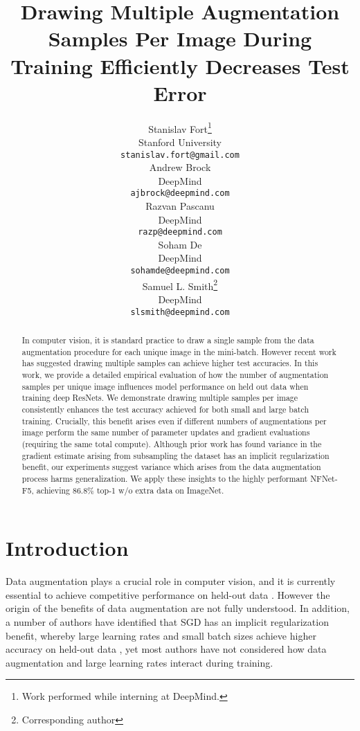 \documentclass{article}
\title{Drawing Multiple Augmentation Samples Per Image During Training Efficiently Decreases Test Error}
\author{Stanislav Fort\thanks{Work performed while interning at DeepMind.} \\
  Stanford University\\
  \texttt{stanislav.fort@gmail.com} \\
\And
  Andrew Brock  \\
  DeepMind \\
\texttt{ajbrock@deepmind.com} \\
   \AND
  Razvan Pascanu \\
  DeepMind \\
\texttt{razp@deepmind.com} \\
   \And
  Soham De \\
  DeepMind \\
\texttt{sohamde@deepmind.com} \\
   \And
   Samuel L. Smith\thanks{Corresponding author} \\
  DeepMind \\
\texttt{slsmith@deepmind.com} \\
}
\begin{document}
\maketitle


\begin{abstract}
In computer vision, it is standard practice to draw a single sample from the data augmentation procedure for each unique image in the mini-batch. However recent work has suggested drawing multiple samples can achieve higher test accuracies. In this work, we provide a detailed empirical evaluation of how the number of augmentation samples per unique image influences model performance on held out data when training deep ResNets. We demonstrate drawing multiple samples per image consistently enhances the test accuracy achieved for both small and large batch training. Crucially, this benefit arises even if different numbers of augmentations per image perform the same number of parameter updates and gradient evaluations (requiring the same total compute). Although prior work has found variance in the gradient estimate arising from subsampling the dataset has an implicit regularization benefit, our experiments suggest variance which arises from the data augmentation process harms generalization. We apply these insights to the highly performant NFNet-F5, achieving 86.8$\%$ top-1 w/o extra data on ImageNet.
\end{abstract}

\section{Introduction}

Data augmentation plays a crucial role in computer vision, and it is currently essential to achieve competitive performance on held-out data \citep{shorten2019survey}. However the origin of the benefits of data augmentation are not fully understood. In addition, a number of authors have identified that SGD has an implicit regularization benefit, whereby large learning rates and small batch sizes achieve higher accuracy on held-out data \citep{keskar2016large,mandt2017stochastic, smith2017bayesian, jastrzkebski2017three, chaudhari2018stochastic, li2019towards, smith2021origin}, yet most authors have not considered how data augmentation and large learning rates interact during training. 
\end{document}
